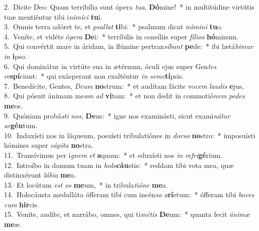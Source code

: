 {2.~}Dícite Deo: Quam terribília sunt ópera \textit{tu}\textit{a}, \textbf{Dó}mine!~* in multitúdine virtútis tuæ mentiéntur tibi i\textit{ni}\textit{mí}\textit{ci} \textbf{tu}i.\\
{3.~}Omnis terra adóret te, et \textit{psal}\textit{lat} \textbf{ti}bi:~* psalmum dicat \textit{nó}\textit{mi}\textit{ni} \textbf{tu}o.\\
{4.~}Veníte, et vidéte ó\textit{pe}\textit{ra} \textbf{De}i:~* terríbilis in consíliis super \textit{fí}\textit{li}\textit{os} \textbf{hó}minum.\\
{5.~}Qui convértit mare in áridam, in flúmine pertran\textit{sí}\textit{bunt} \textbf{pe}de:~* ibi lætá\textit{bi}\textit{mur} \textit{in} \textbf{i}pso.\\
{6.~}Qui dominátur in virtúte sua in ætérnum, óculi ejus super Gen\textit{tes} \textit{re}\textbf{spí}ciunt:~* qui exásperant non exalténtur \textit{in} \textit{se}\textit{me}\textbf{tí}psis.\\
{7.~}Benedícite, Gentes, \textit{De}\textit{um} \textbf{no}strum:~* et audítam fácite vo\textit{cem} \textit{lau}\textit{dis} \textbf{e}jus,\\
{8.~}Qui pósuit ánimam me\textit{am} \textit{ad} \textbf{vi}tam:~* et non dedit in commotió\textit{nem} \textit{pe}\textit{des} \textbf{me}os.\\
{9.~}Quóniam probá\textit{sti} \textit{nos}, \textbf{De}us:~* igne nos examinásti, sicut exami\textit{ná}\textit{tur} \textit{ar}\textbf{gén}tum.\\
{10.~}Induxísti nos in láqueum, posuísti tribulatiónes in \textit{dor}\textit{so} \textbf{no}stro:~* imposuísti hómines super \textit{cá}\textit{pi}\textit{ta} \textbf{no}stra.\\
{11.~}Transívimus per i\textit{gnem} \textit{et} \textbf{a}quam:~* et eduxísti nos \textit{in} \textit{re}\textit{fri}\textbf{gé}rium.\\
{12.~}Introíbo in domum tuam in \textit{ho}\textit{lo}\textbf{cáu}stis:~* reddam tibi vota mea, quæ distinxérunt \textit{lá}\textit{bi}\textit{a} \textbf{me}a.\\
{13.~}Et locútum \textit{est} \textit{os} \textbf{me}um,~* in tribula\textit{ti}\textit{ó}\textit{ne} \textbf{me}a.\\
{14.~}Holocáusta medulláta ófferam tibi cum incén\textit{so} \textit{a}\textbf{rí}etum:~* ófferam tibi \textit{bo}\textit{ves} \textit{cum} \textbf{hir}cis.\\
{15.~}Veníte, audíte, et narrábo, omnes, qui ti\textit{mé}\textit{tis} \textbf{De}um:~* quanta fecit \textit{á}\textit{ni}\textit{mæ} \textbf{me}æ.\\

